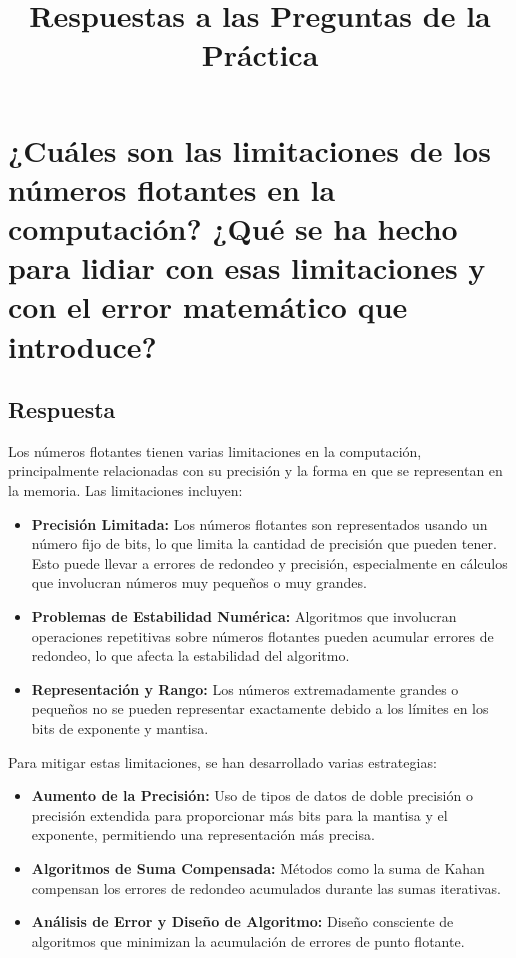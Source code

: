\documentclass{article}
\title{Respuestas a las Preguntas de la Práctica}
\author{}
\date{}
\begin{document}
\maketitle

\section{¿Cuáles son las limitaciones de los números flotantes en la computación? ¿Qué se ha hecho para lidiar con esas limitaciones y con el error matemático que introduce?}
\subsection{Respuesta}
Los números flotantes tienen varias limitaciones en la computación, principalmente relacionadas con su precisión y la forma en que se representan en la memoria. Las limitaciones incluyen:
\begin{itemize}
    \item \textbf{Precisión Limitada:} Los números flotantes son representados usando un número fijo de bits, lo que limita la cantidad de precisión que pueden tener. Esto puede llevar a errores de redondeo y precisión, especialmente en cálculos que involucran números muy pequeños o muy grandes.
    \item \textbf{Problemas de Estabilidad Numérica:} Algoritmos que involucran operaciones repetitivas sobre números flotantes pueden acumular errores de redondeo, lo que afecta la estabilidad del algoritmo.
    \item \textbf{Representación y Rango:} Los números extremadamente grandes o pequeños no se pueden representar exactamente debido a los límites en los bits de exponente y mantisa.
\end{itemize}

Para mitigar estas limitaciones, se han desarrollado varias estrategias:
\begin{itemize}
    \item \textbf{Aumento de la Precisión:} Uso de tipos de datos de doble precisión o precisión extendida para proporcionar más bits para la mantisa y el exponente, permitiendo una representación más precisa.
    \item \textbf{Algoritmos de Suma Compensada:} Métodos como la suma de Kahan compensan los errores de redondeo acumulados durante las sumas iterativas.
    \item \textbf{Análisis de Error y Diseño de Algoritmo:} Diseño consciente de algoritmos que minimizan la acumulación de errores de punto flotante.
\end{itemize}
\end{document}
